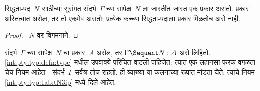 \begin{prop}
सिद्धता-पद~$N$ साठीच्या सुसंगत संदर्भ~$\Gamma$ च्या
सापेक्ष~$N$ ला जास्तीत जास्त एक प्रकार असतो. प्रकार
अस्तित्वात असेल, तर तो एकमेव असतो; प्रत्येक कच्च्या
सिद्धता-पदाला प्रकार मिळतोच असे नाही.
\end{prop}

\begin{proof}
  ~$N$ वर विगमनाने.
\end{proof}

संदर्भ~$\Gamma$ च्या सापेक्ष~$N$ चा प्रकार~$A$
असेल, तर $\Gamma \Sequent N : A$ असे लिहितो.
\ref{int:pty:typ:defn:type} मधील उपवाक्ये परिचित वाटली पाहिजेत:
त्यात एक लहानसा फरक वगळता  चेच नियम
आहेत—संदर्भ~$\Gamma$ सर्वत्र तोच राहतो. ही
व्याख्या  या कलनाच्या रूपात मांडता येते;
त्याचे नियम \ref{int:pty:typ:tab:tN3ip} मध्ये दिले आहेत.









